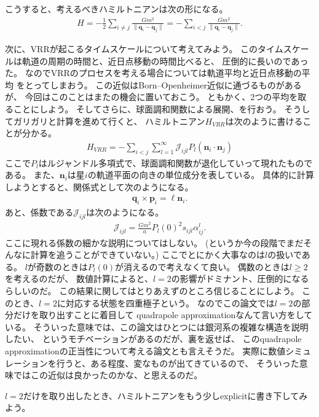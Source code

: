 \documentclass[10pt, pre, twocolumn, showpacs, aps]{revtex4-1}
\begin{document}
こうすると、考えるべきハミルトニアンは次の形になる。
\begin{align}
H=-\frac{1}{2}\sum_{i\ne j}\frac{Gm^{2}}{\|\pmb{q}_{i}-\pmb{q}_{j}\|}
=-\sum_{i<j}\frac{Gm^{2}}{\|\pmb{q}_{i}-\pmb{q}_{j}\|}.
\end{align}

次に、VRRが起こるタイムスケールについて考えてみよう。
このタイムスケールは軌道の周期の時間と、近日点移動の時間比べると、
圧倒的に長いのであった。
なのでVRRのプロセスを考える場合については軌道平均と近日点移動の平均
をとってしまおう。
この近似はBorn--Openheimer近似に通づるものがあるが、
今回はこのことはまたの機会に置いておこう。
ともかく、2つの平均を取ることにしよう。
そしてさらに、球面調和関数による展開、を行おう。
そうしてガリガリと計算を進めて行くと、
ハミルトニアン$H_{VRR}$は次のように書けることが分かる。
\begin{align}
H_{VRR}=-\sum_{i<j}\sum_{l=1}^{\infty}\mathcal{J}_{ijl}P_{l}(\pmb{n}_{i}\cdot\pmb{n}_{j})
\end{align}
ここで$P_{l}$はルジャンドル多項式で、球面調和関数が退化していって現れたものである。
また、$\pmb{n}_{i}$は星$i$の軌道平面の向きの単位成分を表している。
具体的に計算しようとすると、関係式として次のようになる。
\begin{align}
\pmb{q}_{i}\times\pmb{p}_{i}=\ell\pmb{n}_{i}.
\end{align}
あと、係数である$\mathcal{J}_{ijl}$は次のようになる。
\begin{align}
\mathcal{J}_{ijl}=\frac{Gm^{2}}{a}P_{l}(0)^{2}s_{ijl}\alpha_{ij}^{l}.
\end{align}
ここに現れる係数の細かな説明についてはしない。
(というか今の段階でまだそんなに計算を追うことができていない。)
ここでとにかく大事なのは$l$の扱いである。
$l$が奇数のときは$P_{l}(0)$が消えるので考えなくて良い。
偶数のときは$l\geq 2$を考えるのだが、
数値計算によると、$l=2$の影響がドミナント、圧倒的になるらしいのだ。
この結果に関してはとりあえずのところ信じることにしよう。
このとき、$l=2$に対応する状態を四重極子という。
なのでこの論文では$l=2$の部分だけを取り出すことに着目して
quadrapole approximationなんて言い方をしている。
そういった意味では、この論文はひとつには銀河系の複雑な構造を説明したい、
というモチベーションがあるのだが、裏を返せば、
このquadrapole approximationの正当性について考える論文とも言えそうだ。
実際に数値シミュレーションを行うと、ある程度、変なものが出てきているので、
そういった意味ではこの近似は良かったのかな、と思えるのだ。

$l=2$だけを取り出したとき、ハミルトニアンをもう少しexplicitに書き下してみよう。
\end{document}
